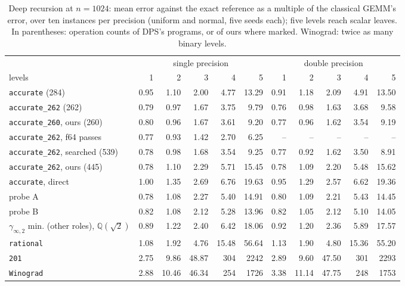 \begin{table}[t]
\centering
\caption{Deep recursion at $n=1024$: mean error against the exact reference as a multiple of the classical GEMM's error, over ten instances per precision (uniform and normal, five seeds each); five levels reach scalar leaves.  In parentheses: operation counts of DPS's programs, or of ours where marked.  Winograd: twice as many binary levels.}
\label{tab:deep}
\footnotesize
\setlength{\tabcolsep}{3.5pt}
\begin{tabular}{lrrrrrrrrrr}
\toprule
 & \multicolumn{5}{c}{single precision} & \multicolumn{5}{c}{double precision}\\
\cmidrule(lr){2-6}\cmidrule(lr){7-11}
levels & 1 & 2 & 3 & 4 & 5 & 1 & 2 & 3 & 4 & 5\\
\midrule
\texttt{accurate} (284) & 0.95 & 1.10 & 2.00 & 4.77 & 13.29 & 0.91 & 1.18 & 2.09 & 4.91 & 13.50\\
\texttt{accurate\_262} (262) & 0.79 & 0.97 & 1.67 & 3.75 & 9.79 & 0.76 & 0.98 & 1.63 & 3.68 & 9.58\\
\texttt{accurate\_260}, ours (260) & 0.80 & 0.96 & 1.67 & 3.61 & 9.20 & 0.77 & 0.96 & 1.62 & 3.54 & 9.19\\
\texttt{accurate\_262}, f64 passes & 0.77 & 0.93 & 1.42 & 2.70 & 6.25 & -- & -- & -- & -- & --\\
\texttt{accurate\_262}, searched (539) & 0.78 & 0.98 & 1.68 & 3.54 & 9.25 & 0.77 & 0.92 & 1.62 & 3.50 & 8.91\\
\texttt{accurate\_262}, ours (445) & 0.78 & 1.10 & 2.29 & 5.71 & 15.45 & 0.78 & 1.09 & 2.20 & 5.48 & 15.62\\
\texttt{accurate}, direct & 1.00 & 1.35 & 2.69 & 6.76 & 19.63 & 0.95 & 1.29 & 2.57 & 6.62 & 19.36\\
probe A & 0.78 & 1.08 & 2.27 & 5.40 & 14.91 & 0.80 & 1.09 & 2.21 & 5.43 & 14.45\\
probe B & 0.82 & 1.08 & 2.12 & 5.28 & 13.96 & 0.82 & 1.05 & 2.12 & 5.10 & 14.05\\
$\gamma_{\infty,2}$ min. (other roles), $\mathbb{Q}(\sqrt2)$ & 0.89 & 1.22 & 2.40 & 6.42 & 18.06 & 0.92 & 1.20 & 2.36 & 5.89 & 17.57\\
\texttt{rational} & 1.08 & 1.92 & 4.76 & 15.48 & 56.64 & 1.13 & 1.90 & 4.80 & 15.36 & 55.20\\
\texttt{201} & 2.75 & 9.86 & 48.87 & 304 & 2242 & 2.89 & 9.60 & 47.50 & 301 & 2293\\
\midrule
\texttt{Winograd} & 2.88 & 10.46 & 46.34 & 254 & 1726 & 3.38 & 11.14 & 47.75 & 248 & 1753\\
\bottomrule
\end{tabular}
\end{table}

